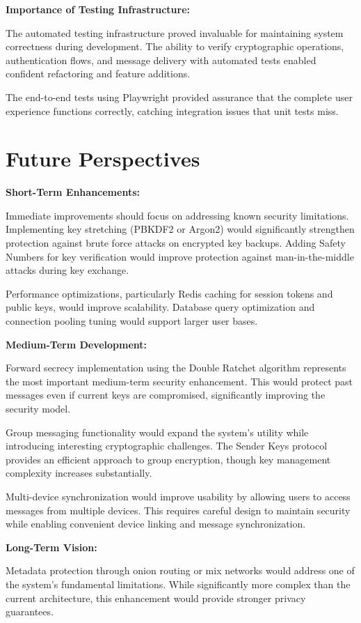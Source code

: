 \textbf{Importance of Testing Infrastructure:}

The automated testing infrastructure proved invaluable for maintaining system correctness during development. The ability to verify cryptographic operations, authentication flows, and message delivery with automated tests enabled confident refactoring and feature additions.

The end-to-end tests using Playwright provided assurance that the complete user experience functions correctly, catching integration issues that unit tests miss.

\section*{Future Perspectives}

\textbf{Short-Term Enhancements:}

Immediate improvements should focus on addressing known security limitations. Implementing key stretching (PBKDF2 or Argon2) would significantly strengthen protection against brute force attacks on encrypted key backups. Adding Safety Numbers for key verification would improve protection against man-in-the-middle attacks during key exchange.

Performance optimizations, particularly Redis caching for session tokens and public keys, would improve scalability. Database query optimization and connection pooling tuning would support larger user bases.

\textbf{Medium-Term Development:}

Forward secrecy implementation using the Double Ratchet algorithm represents the most important medium-term security enhancement. This would protect past messages even if current keys are compromised, significantly improving the security model.

Group messaging functionality would expand the system's utility while introducing interesting cryptographic challenges. The Sender Keys protocol provides an efficient approach to group encryption, though key management complexity increases substantially.

Multi-device synchronization would improve usability by allowing users to access messages from multiple devices. This requires careful design to maintain security while enabling convenient device linking and message synchronization.

\textbf{Long-Term Vision:}

Metadata protection through onion routing or mix networks would address one of the system's fundamental limitations. While significantly more complex than the current architecture, this enhancement would provide stronger privacy guarantees.

